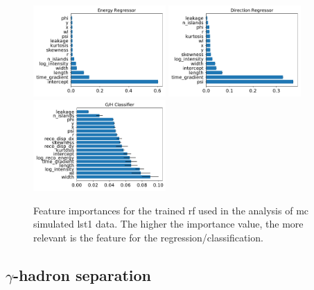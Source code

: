 \documentclass[main.tex]{subfiles}
\begin{document}
\begin{figure}
\centering
\includegraphics[width=0.45\textwidth]{Pictures/reg_energy_importances.pdf}
\includegraphics[width=0.45\textwidth]{Pictures/reg_disp_vector_importances.pdf}
\includegraphics[width=0.45\textwidth]{Pictures/gls_importances.pdf}
  \caption{Feature importances for the trained \gls{rf} used in the analysis of \gls{mc} simulated \gls{lst}1 data. The higher the importance value, the more relevant is the feature for the regression/classification. }
    \label{fig:importances}
\end{figure}


\subsection{$\gamma$-hadron separation}
\end{document}

